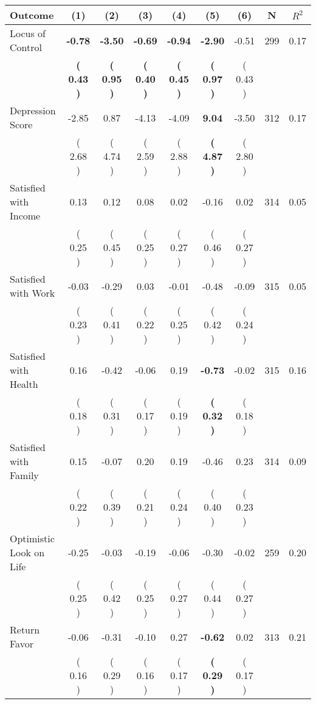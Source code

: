 \begin{tabular}{lcccccccc}
\toprule
 \textbf{Outcome} & \textbf{(1)} & \textbf{(2)} & \textbf{(3)} & \textbf{(4)} & \textbf{(5)} & \textbf{(6)} & \textbf{N} & \textbf{$ R^2$} \\
\midrule
Locus of Control & \textbf{    -0.78} & \textbf{    -3.50} & \textbf{    -0.69} & \textbf{    -0.94} & \textbf{    -2.90} &     -0.51 & 299 &       0.17 \\ 
 & \textbf{(     0.43 )} & \textbf{(     0.95 )} & \textbf{(     0.40 )} & \textbf{(     0.45 )} & \textbf{(     0.97 )} & (     0.43 ) & \\
Depression Score &     -2.85 &      0.87 &     -4.13 &     -4.09 & \textbf{     9.04} &     -3.50 & 312 &       0.17 \\ 
 & (     2.68 ) & (     4.74 ) & (     2.59 ) & (     2.88 ) & \textbf{(     4.87 )} & (     2.80 ) & \\
Satisfied with Income &      0.13 &      0.12 &      0.08 &      0.02 &     -0.16 &      0.02 & 314 &       0.05 \\ 
 & (     0.25 ) & (     0.45 ) & (     0.25 ) & (     0.27 ) & (     0.46 ) & (     0.27 ) & \\
Satisfied with Work &     -0.03 &     -0.29 &      0.03 &     -0.01 &     -0.48 &     -0.09 & 315 &       0.05 \\ 
 & (     0.23 ) & (     0.41 ) & (     0.22 ) & (     0.25 ) & (     0.42 ) & (     0.24 ) & \\
Satisfied with Health &      0.16 &     -0.42 &     -0.06 &      0.19 & \textbf{    -0.73} &     -0.02 & 315 &       0.16 \\ 
 & (     0.18 ) & (     0.31 ) & (     0.17 ) & (     0.19 ) & \textbf{(     0.32 )} & (     0.18 ) & \\
Satisfied with Family &      0.15 &     -0.07 &      0.20 &      0.19 &     -0.46 &      0.23 & 314 &       0.09 \\ 
 & (     0.22 ) & (     0.39 ) & (     0.21 ) & (     0.24 ) & (     0.40 ) & (     0.23 ) & \\
Optimistic Look on Life &     -0.25 &     -0.03 &     -0.19 &     -0.06 &     -0.30 &     -0.02 & 259 &       0.20 \\ 
 & (     0.25 ) & (     0.42 ) & (     0.25 ) & (     0.27 ) & (     0.44 ) & (     0.27 ) & \\
Return Favor &     -0.06 &     -0.31 &     -0.10 &      0.27 & \textbf{    -0.62} &      0.02 & 313 &       0.21 \\ 
 & (     0.16 ) & (     0.29 ) & (     0.16 ) & (     0.17 ) & \textbf{(     0.29 )} & (     0.17 ) & \\

\end{tabular}
